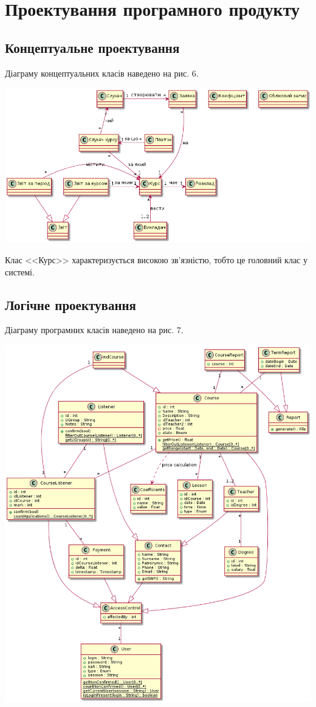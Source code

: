 \bigbreak
\section{Проектування програмного продукту}
\subsection{Концептуальне проектування}
\bigbreak
Діаграму концептуальних класів наведено на рис. 6.

\noindent\includegraphics[width=17cm]{pp_pw3_conc.png}

Клас <<Курс>> характеризується високою зв'язністю, тобто це головний клас у системі.
\newpage
\subsection{Логічне проектування}
\bigbreak
Діаграму програмних класів наведено на рис. 7.

\noindent\includegraphics[width=17cm]{pp_pw3_clas.png}

